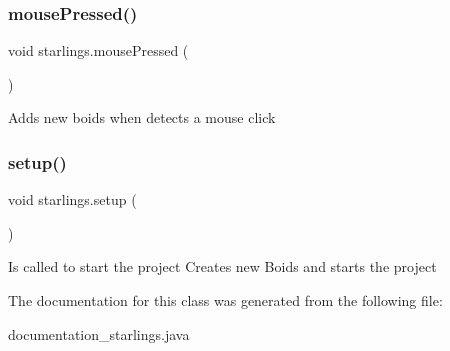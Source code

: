 \subsubsection{\texorpdfstring{mouse\+Pressed()}{mousePressed()}}
{\footnotesize\ttfamily void starlings.\+mouse\+Pressed (\begin{DoxyParamCaption}{ }\end{DoxyParamCaption})\hspace{0.3cm}{\ttfamily [inline]}}

Adds new boids when detects a mouse click\mbox{\label{classstarlings_ae3237d3011a7d17127f7c5d3b7db4c8d}} 
\subsubsection{\texorpdfstring{setup()}{setup()}}
{\footnotesize\ttfamily void starlings.\+setup (\begin{DoxyParamCaption}{ }\end{DoxyParamCaption})\hspace{0.3cm}{\ttfamily [inline]}}

Is called to start the project Creates new Boids and starts the project

The documentation for this class was generated from the following file\+:\begin{DoxyCompactItemize}
\item 
documentation\+\_\+starlings.\+java\end{DoxyCompactItemize}
